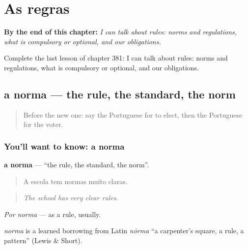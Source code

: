 
\chapter{As regras}
\label{ch:pt-as-regras}

\begin{chapteropening}
\textbf{By the end of this chapter:} \emph{I can talk about rules: norms and regulations, what is compulsory or optional, and our obligations.}

Complete the last lesson of chapter 381: I can talk about rules: norms and regulations, what is compulsory or optional, and our obligations.
\end{chapteropening}

\section[a norma]{a norma — the rule, the standard, the norm}

\label{lesson:PT-C381-norma}



\begin{quote}
Before the new one: say the Portuguese for to elect, then the Portuguese for the voter.
\end{quote}

\subsection*{You'll want to know: a norma}
\textbf{a norma} — \textquotedblleft{}the rule, the standard, the norm\textquotedblright{}.

\begin{quote}
A escola tem normas muito claras.
\end{quote}

\begin{quote}
\emph{The school has very clear rules.}
\end{quote}

\emph{Por norma} — as a rule, usually.

\begin{cousinweb}
\emph{norma} is a learned borrowing from Latin \emph{nōrma} \textquotedblleft{}a carpenter's square, a rule, a pattern\textquotedblright{} (Lewis \& Short).
\end{cousinweb}

